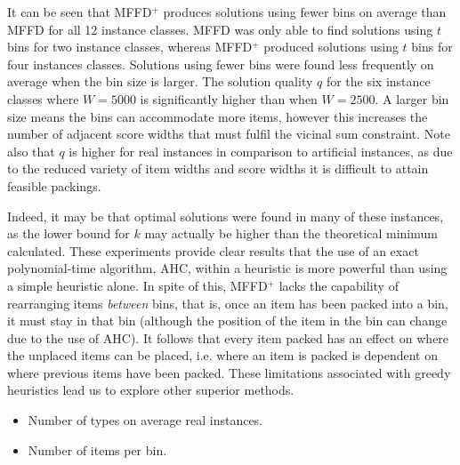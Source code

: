 \documentclass[authoryear]{elsarticle}
\begin{document}
It can be seen that MFFD$^+$ produces solutions using fewer bins on average than MFFD for all 12 instance classes. MFFD was only able to find solutions using $t$ bins for two instance classes, whereas MFFD$^+$ produced solutions using $t$ bins for four instances classes. Solutions using fewer bins were found less frequently on average when the bin size is larger. The solution quality $q$ for the six instance classes where $W = 5000$ is significantly higher than when $W = 2500$. A larger bin size means the bins can accommodate more items, however this increases the number of adjacent score widths that must fulfil the vicinal sum constraint. Note also that $q$ is higher for real instances in comparison to artificial instances, as due to the reduced variety of item widths and score widths it is difficult to attain feasible packings. 

Indeed, it may be that optimal solutions were found in many of these instances, as the lower bound for $k$ may actually be higher than the theoretical minimum calculated. These experiments provide clear results that the use of an exact polynomial-time algorithm, AHC, within a heuristic is more powerful than using a simple heuristic alone. In spite of this, MFFD$^+$ lacks the capability of rearranging items \emph{between} bins, that is, once an item has been packed into a bin, it must stay in that bin (although the position of the item in the bin can change due to the use of AHC). It follows that every item packed has an effect on where the unplaced items can be placed, i.e. where an item is packed is dependent on where previous items have been packed. These limitations associated with greedy heuristics lead us to explore other superior methods. 

{\color{myPink}
\begin{itemize}[leftmargin=*]
	\item Number of types on average real instances.
	\item Number of items per bin.
\end{itemize}
}

\end{document}
